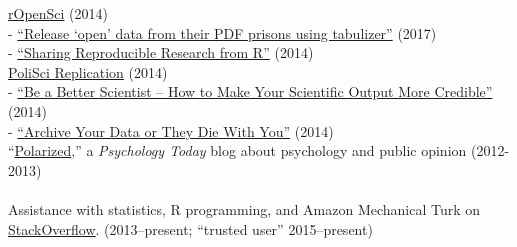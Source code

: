 \documentclass[12pt]{article}
\newcommand{\topic}[1]{\pagebreak[3]\indent {\color{lg}{\footnotesize #1 }}\\}
\newcommand{\entry}[1]{\indent {\color{lg}\guillemotright}\hspace{2pt}#1\vspace{.25em}\\}
\newcommand{\subentry}[1]{{\color{lg}-} #1\vspace{.25em}\\}
\begin{document}
		\entry{\href{http://ropensci.org/blog/}{rOpenSci} (2014)}
			\subentry{\href{https://ropensci.org/blog/2017/04/18/tabulizer/}{``Release `open' data from their PDF prisons using tabulizer''} (2017)}
            \subentry{\href{https://ropensci.org/blog/2014/02/20/dvn-dataverse-network/}{``Sharing Reproducible Research from R''} (2014)}
		\entry{\href{http://politicalsciencereplication.wordpress.com/}{PoliSci Replication} (2014)}
			\subentry{\href{https://politicalsciencereplication.wordpress.com/2014/06/04/guest-post-be-a-better-scientist-how-to-make-your-scientific-output-more-credible-by-thomas-leeper/}{``Be a Better Scientist -- How to Make Your Scientific Output More Credible''} (2014)}
			\subentry{\href{https://politicalsciencereplication.wordpress.com/2014/05/21/guest-post-why-reproducibility-requires-data-archiving-by-thomas-leeper/}{``Archive Your Data or They Die With You''} (2014)}
		\entry{``\href{http://www.psychologytoday.com/blog/polarized}{Polarized},'' a \textit{Psychology Today} blog about psychology and public opinion (2012-2013)}
	
	\topic{Miscellaneous}
		\entry{Assistance with statistics, R programming, and Amazon Mechanical Turk on \href{http://stackoverflow.com/users/2338862/thomas}{StackOverflow}. (2013--present; ``trusted user'' 2015--present)}
\end{document}
